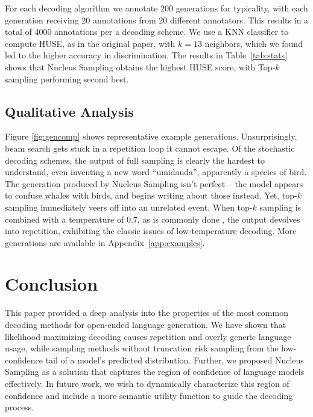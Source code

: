 For each decoding algorithm we annotate 200 generations for typicality, with each generation receiving 20 annotations from 20 different annotators. This results in a total of 4000 annotations per a decoding scheme.  We use a KNN classifier to compute HUSE, as in the original paper, with $k=13$ neighbors, which we found led to the higher accuracy in discrimination. The results in Table~\ref{tab:stats} shows that Nucleus Sampling obtains the highest HUSE score, with Top-$k$ sampling performing second best.

\subsection{Qualitative Analysis}

Figure \ref{fig:gencomp} shows representative example generations. Unsurprisingly, beam search gets stuck in a repetition loop it cannot escape. Of the stochastic decoding schemes, the output of full sampling is clearly the hardest to understand, even inventing a new word ``umidauda'', apparently a species of bird. The generation produced by Nucleus Sampling isn't perfect -- the model appears to confuse whales with birds, and begins writing about those instead. Yet, top-$k$ sampling immediately veers off into an unrelated event. When top-$k$ sampling is combined with a temperature of 0.7, as is commonly done \citep{radford2019BetterLMs,fan2018hierarchical}, the output devolves into repetition, exhibiting the classic issues of low-temperature decoding. More generations are available in Appendix~\ref{app:examples}.
 \section{Conclusion}

This paper provided a deep analysis into the properties of the most common decoding methods for open-ended language generation. We have shown that likelihood maximizing decoding causes repetition and overly generic language usage, while sampling methods without truncation risk sampling from the low-confidence tail of a model's predicted distribution. Further, we proposed Nucleus Sampling as a solution that captures the region of confidence of language models effectively. In future work, we wish to dynamically characterize this region of confidence and include a more semantic utility function to guide the decoding process.


